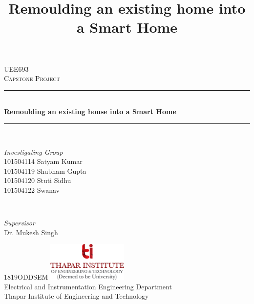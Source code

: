 \documentclass[12pt,a4paper,titlepage,twoside]{article}
\title{Remoulding an existing home into a Smart Home}
\begin{document}
        \begin{titlepage} 
            \newcommand{\HRule}{\rule{\linewidth}{0.5mm}}
            \centering 
            \textsc{\Large UEE693}\\[0.5cm] 
            \textsc{\large Capstone Project}\\[0.5cm]
            \HRule\\[0.4cm]
            {\huge\bfseries Remoulding an existing house into a Smart Home}\\[0.4cm]
            \HRule\\[1.5cm]
            \begin{minipage}{0.5\textwidth}
                \begin{flushleft}
                    \large
                    \textit{Investigating Group}\\[0.25cm]
                    101504114 Satyam Kumar\\
                    101504119 Shubham Gupta\\
                    101504120 Stuti Sidhu\\
                    101504122 Swanav\\
                \end{flushleft}
            \end{minipage}
            ~
            \begin{minipage}{0.4\textwidth}
                \begin{flushright}
                    \large
                    \textit{Supervisor}\\
                    Dr. Mukesh Singh
                \end{flushright}
            \end{minipage}
            \vfill\vfill\vfill
            {\large 1819ODDSEM}		
            \vfill\vfill
            \includegraphics[width=0.3\textwidth]{logo.png}\\
            Electrical and Instrumentation Engineering Department\\
            Thapar Institute of Engineering and Technology
        \end{titlepage}
    
        \tableofcontents
        \newpage
    
\end{document}
